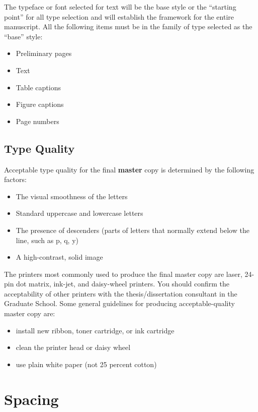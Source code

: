 The typeface or font selected for text will be the base style or the
``starting point'' for all type selection \cite{wordperfect1988} and
will establish the framework for the entire manuscript. All the
following items must be in the family of type selected as the ``base''
style:
\begin{itemize}
\item Preliminary pages
\item Text
\item Table captions
\item Figure captions
\item Page numbers
\end{itemize}

\subsection{Type Quality}
\label{sec:TypeQuality}

Acceptable type quality for the final \textbf{master} copy is
determined by the following factors:
\begin{itemize}
\item The visual smoothness of the letters
\item Standard uppercase and lowercase letters
\item The presence of descenders (parts of letters that normally
  extend below the line, such as p, q, y)
\item A high-contrast, solid image
\end{itemize}

The printers most commonly used to produce the final master copy are
laser, 24-pin dot matrix, ink-jet, and daisy-wheel printers. You
should confirm the acceptability of other printers with the
the\-sis/dis\-ser\-ta\-tion consultant in the Graduate School. Some
general guidelines for producing acceptable-quality master copy are:
\begin{itemize}
\item install new ribbon, toner cartridge, or ink cartridge
\item clean the printer head or daisy wheel
\item use plain white paper (not 25 percent cotton)
\end{itemize}

\section{Spacing}
\label{sec:Spacing}

